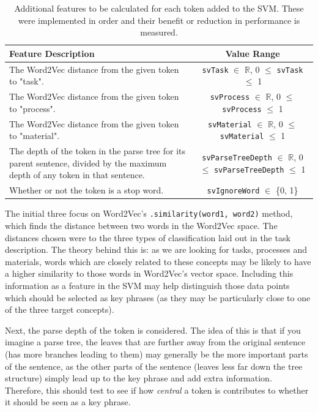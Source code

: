 \begin{table}
	\centering
	\begin{tabular}{ C{7cm} | c }
		\textbf{Feature Description} & \textbf{Value Range} \\
		\hline
		The Word2Vec distance from the given token to "task". & \texttt{svTask} $\in$ $\mathbb{R}$,  0 $\leq$ \texttt{svTask} $\leq$ 1 \\
		\hline
		The Word2Vec distance from the given token to "process". & \texttt{svProcess} $\in$ $\mathbb{R}$,  0 $\leq$ \texttt{svProcess} $\leq$ 1 \\
		\hline
		The Word2Vec distance from the given token to "material". & \texttt{svMaterial} $\in$ $\mathbb{R}$,  0 $\leq$ \texttt{svMaterial} $\leq$ 1 \\
		\hline
		The depth of the token in the parse tree for its parent sentence, divided by the maximum depth of any token in that sentence. & \texttt{svParseTreeDepth} $\in$ $\mathbb{R}$,  0 $\leq$ \texttt{svParseTreeDepth} $\leq$ 1 \\
		\hline
		Whether or not the token is a stop word. & \texttt{svIgnoreWord} $\in$ \{0, 1\} \\
	\end{tabular}
	\caption[Additional Key Phrase SVM Features]{Additional features to be calculated for each token added to the SVM. These were implemented in order and their benefit or reduction in performance is measured.}
	\label{table:kpextsvs}
\end{table}

The initial three focus on Word2Vec's \texttt{.similarity(word1, word2)} method, which finds the distance between two words in the Word2Vec space. The distances chosen were to the three types of classification laid out in the task description. The theory behind this is: as we are looking for tasks, processes and materials, words which are closely related to these concepts may be likely to have a higher similarity to those words in Word2Vec's vector space. Including this information as a feature in the SVM may help distinguish those data points which should be selected as key phrases (as they may be particularly close to one of the three target concepts).

Next, the parse depth of the token is considered. The idea of this is that if you imagine a parse tree, the leaves that are further away from the original sentence (has more branches leading to them) may generally be the more important parts of the sentence, as the other parts of the sentence (leaves less far down the tree structure) simply lead up to the key phrase and add extra information. Therefore, this should test to see if how \textit{central} a token is contributes to whether it should be seen as a key phrase.

